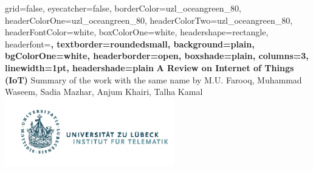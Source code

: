 \documentclass[a0paper,portrait]{baposter}
\begin{document}



\background{
}

\begin{poster}{
	grid=false,
	eyecatcher=false, 
	borderColor=uzl_oceangreen_80,
	headerColorOne=uzl_oceangreen_80,
	headerColorTwo=uzl_oceangreen_80,
	headerFontColor=white,
	boxColorOne=white,
	headershape=rectangle,
	headerfont=\large\bf,
	textborder=roundedsmall,
	background=plain,
	bgColorOne=white,
	headerborder=open,
	boxshade=plain,
	columns=3,
	linewidth=1pt,
	headershade=plain
}
{
}
{
	\vspace{0.3cm}
  \textcolor{uzl_oceangreen_80}{\textbf{A Review on Internet of Things (IoT)}}
    \vspace{0.3cm}
}
{
  \textcolor{uzl_orange_2}{\textsf{Summary of the work with the same name by M.U. Farooq, Muhammad Waseem, Sadia Mazhar, Anjum Khairi, Talha Kamal \cite{AReViewOnInternetOfThings}}}
}
{
  \hspace{1cm}
  \includegraphics[height=8em]{Logo_Inst_Telematik_orig}
}


\end{poster}
\end{document}
